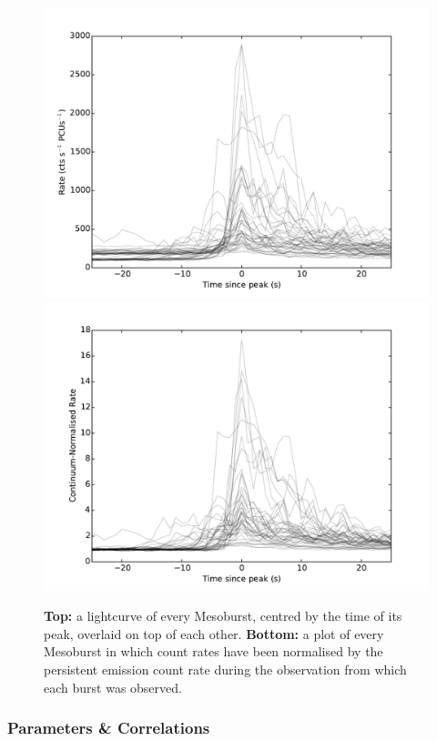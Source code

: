 \begin{figure}
  \centering
  \includegraphics[width=.9\linewidth, trim={0.4cm 0 1.1cm 0},clip]{images/1000meso.pdf}
  \includegraphics[width=.9\linewidth, trim={0.4cm 0 1.1cm 0},clip]{images/1000meso_renormed.pdf}
  \caption[A plot of every Mesoburst, centred by the time of its peak, overlaid on top of each other.]{\small  \textbf{Top:} a lightcurve of every Mesoburst, centred by the time of its peak, overlaid on top of each other.  \textbf{Bottom:} a plot of every Mesoburst in which count rates have been normalised by the persistent emission count rate during the observation from which each burst was observed.}
  \label{fig:meso_over}
\end{figure}

\subsubsection{Parameters \& Correlations}

